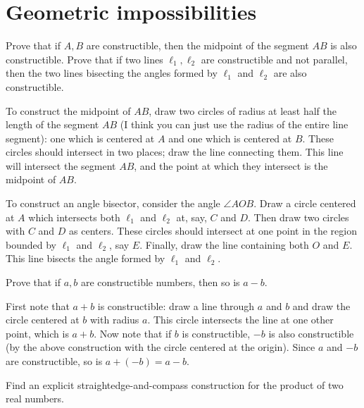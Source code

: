 \documentclass[../../master.tex]{subfiles}
\begin{document}
\section{Geometric impossibilities}

\begin{problem}
    Prove that if $A, B$ are constructible, then the midpoint of the segment $AB$ is also constructible.
    Prove that if two lines $\ell_1, \ell_2$ are constructible and not parallel, then the two lines bisecting the angles formed by $\ell_1$ and $\ell_2$ are also constructible.
\end{problem}

\begin{solution}
    To construct the midpoint of $AB$, draw two circles of radius at least half the length of the segment $AB$ (I think you can just use the radius of the entire line segment): one which is centered at $A$ and one which is centered at $B$.
    These circles should intersect in two places; draw the line connecting them.
    This line will intersect the segment $AB$, and the point at which they intersect is the midpoint of $AB$.

    To construct an angle bisector, consider the angle $\angle AOB$.
    Draw a circle centered at $A$ which intersects both $\ell_1$ and $\ell_2$ at, say, $C$ and $D$.
    Then draw two circles with $C$ and $D$ as centers. 
    These circles should intersect at one point in the region bounded by $\ell_1$ and $\ell_2$, say $E$.
    Finally, draw the line containing both $O$ and $E$.
    This line bisects the angle formed by $\ell_1$ and $\ell_2$.
\end{solution}

\begin{problem}
    Prove that if $a, b$ are constructible numbers, then so is $a - b$.
\end{problem}

\begin{solution}
    First note that $a + b$ is constructible: draw a line through $a$ and $b$ and draw the circle centered at $b$ with radius $a$.
    This circle intersects the line at one other point, which is $a + b$.
    Now note that if $b$ is constructible, $-b$ is also constructible (by the above construction with the circle centered at the origin).
    Since $a$ and $-b$ are constructible, so is $a + (-b) = a - b$.
\end{solution}

\begin{problem}
    Find an explicit straightedge-and-compass construction for the product of two real numbers.
\end{problem}
\end{document}
